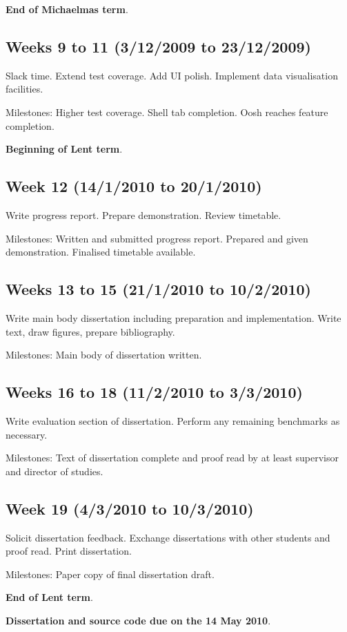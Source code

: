\documentclass[12pt]{article}
\begin{document}
{\bf End of Michaelmas term}.

\subsection*{Weeks 9 to 11 (3/12/2009 to 23/12/2009)}
Slack time. Extend test coverage. Add UI polish. Implement data
visualisation facilities.

Milestones: Higher test coverage. Shell tab completion. Oosh reaches
feature completion.

{\bf Beginning of Lent term}.

\subsection*{Week 12 (14/1/2010 to 20/1/2010)}
Write progress report. Prepare demonstration. Review timetable.

Milestones: Written and submitted progress report. Prepared and given
demonstration. Finalised timetable available.

\subsection*{Weeks 13 to 15 (21/1/2010 to 10/2/2010)}
Write main body dissertation including preparation and
implementation. Write text, draw figures, prepare bibliography.

Milestones: Main body of dissertation written.

\subsection*{Weeks 16 to 18 (11/2/2010 to 3/3/2010)}
Write evaluation section of dissertation. Perform any remaining
benchmarks as necessary.

Milestones: Text of dissertation complete and proof read by at
least supervisor and director of studies.

\subsection*{Week 19 (4/3/2010 to 10/3/2010)}
Solicit dissertation feedback. Exchange dissertations with other
students and proof read. Print dissertation.

Milestones: Paper copy of final dissertation draft.

{\bf End of Lent term}.

{\bf Dissertation and source code due on the 14 May 2010}.
\end{document}
